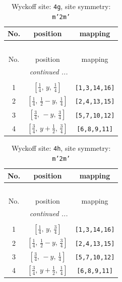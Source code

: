 \documentclass[fleqn,8pt]{jsarticle}
\begin{document}
\renewcommand{\arraystretch}{1.2}
\begin{longtable}{ccc}
\caption{Wyckoff site: {\tt 4g}, site symmetry: {\tt m'2m'}}
 \\
 \hline \hline
No. & position & mapping \\ \hline \endfirsthead

\multicolumn{2}{l}{\tablename\ \thetable{}} \\
 \hline \hline
No. & position & mapping \\ \hline \endhead

 \hline \hline
\multicolumn{2}{r}{\footnotesize\it continued ...} \\ \endfoot

 \hline \hline
\multicolumn{2}{r}{} \\ \endlastfoot

1 & $\left[ \frac{1}{4},\, y,\, \frac{1}{4} \right]$ & {\tt [1,3,14,16]} \\ \hline
2 & $\left[ \frac{1}{4},\, \frac{1}{2} - y,\, \frac{1}{4} \right]$ & {\tt [2,4,13,15]} \\ \hline
3 & $\left[ \frac{3}{4},\, - y,\, \frac{3}{4} \right]$ & {\tt [5,7,10,12]} \\ \hline
4 & $\left[ \frac{3}{4},\, y + \frac{1}{2},\, \frac{3}{4} \right]$ & {\tt [6,8,9,11]} \\
\end{longtable}
\renewcommand{\arraystretch}{1.2}
\begin{longtable}{ccc}
\caption{Wyckoff site: {\tt 4h}, site symmetry: {\tt m'2m'}}
 \\
 \hline \hline
No. & position & mapping \\ \hline \endfirsthead

\multicolumn{2}{l}{\tablename\ \thetable{}} \\
 \hline \hline
No. & position & mapping \\ \hline \endhead

 \hline \hline
\multicolumn{2}{r}{\footnotesize\it continued ...} \\ \endfoot

 \hline \hline
\multicolumn{2}{r}{} \\ \endlastfoot

1 & $\left[ \frac{1}{4},\, y,\, \frac{3}{4} \right]$ & {\tt [1,3,14,16]} \\ \hline
2 & $\left[ \frac{1}{4},\, \frac{1}{2} - y,\, \frac{3}{4} \right]$ & {\tt [2,4,13,15]} \\ \hline
3 & $\left[ \frac{3}{4},\, - y,\, \frac{1}{4} \right]$ & {\tt [5,7,10,12]} \\ \hline
4 & $\left[ \frac{3}{4},\, y + \frac{1}{2},\, \frac{1}{4} \right]$ & {\tt [6,8,9,11]} \\
\end{longtable}
\end{document}
